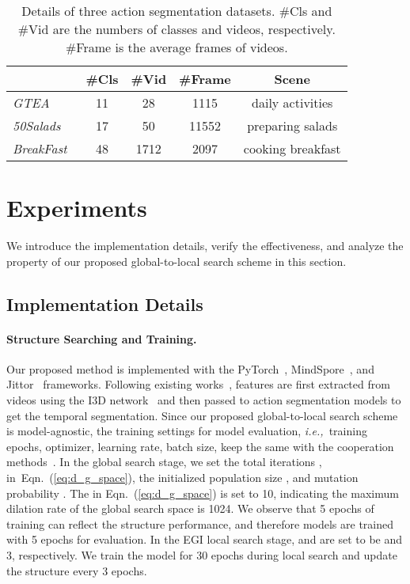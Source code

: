 \documentclass[final]{cvpr}
\renewcommand{\eqref}[1]{Eqn.~(\ref{#1})}
\newcommand{\myPara}[1]{\vspace{-.12in}\paragraph{#1}}
\def\ie{\emph{i.e.,~}}
\begin{document}
\def\GTEA{\textsl{GTEA}~\cite{fathi2011learning}}
\def\Salads{\textsl{50Salads}~\cite{stein2013combining}}
\def\BreakFast{\textsl{BreakFast}~\cite{kuehne2014language}}
\begin{table}[htb]
  \small
  \centering 
  \setlength{\tabcolsep}{2mm}
  \begin{tabular}{lcccc}  \toprule
            & \#Cls &\#Vid&\#Frame& Scene  \\ \midrule
    \GTEA      & 11 & 28 & 1115   & daily activities  \\ \hline
    \Salads    & 17 & 50 & 11552  & preparing salads  \\   \hline 
    \BreakFast & 48 & 1712 & 2097 & cooking breakfast \\ \bottomrule 
  \end{tabular}
  \vspace{2pt}
  \caption{Details of three action segmentation datasets. 
     \#Cls and \#Vid are the numbers of classes and videos, respectively.
     \#Frame is the average frames of videos.
  }\label{tab:datasets}
\end{table}


\section{Experiments} \label{sec:experimets}
We introduce the implementation details, verify the effectiveness, and analyze the property of
our proposed global-to-local search scheme in this section.
\subsection{Implementation Details}
\vspace{3pt}
\label{sec:dataset}
\myPara{Structure Searching and Training.}  Our proposed method is implemented with the PyTorch~\cite{paszke2019pytorch}, MindSpore~\cite{mindspore2020}, and Jittor~\cite{hu2020jittor} frameworks.
Following existing works~\cite{MS-TCN-PAMI20,farha2019ms}, features are first extracted from videos using the I3D network~\cite{carreira2017quo} and then
passed to action segmentation models to get the temporal
segmentation.
Since our proposed global-to-local search scheme is model-agnostic, 
the training settings for model evaluation, 
\ie training epochs, optimizer, learning rate, batch size, keep the same with 
the cooperation methods~\cite{MS-TCN-PAMI20,wangboundary,chen2020action}. In the global search stage, we set the total iterations , 
 in~\eqref{eq:d_g_space}, the initialized population size ,
and mutation probability . 
The  in \eqref{eq:d_g_space} is set to 10, indicating the maximum dilation rate of the global search space is 1024. 
We observe that 5 epochs of training can reflect the structure performance,
and therefore models are trained with 5 epochs for evaluation. In the EGI local search stage,
 and  are set to be  and 3, respectively. We train the model for 30 epochs during 
local search and update the structure every 3 epochs.
\end{document}
